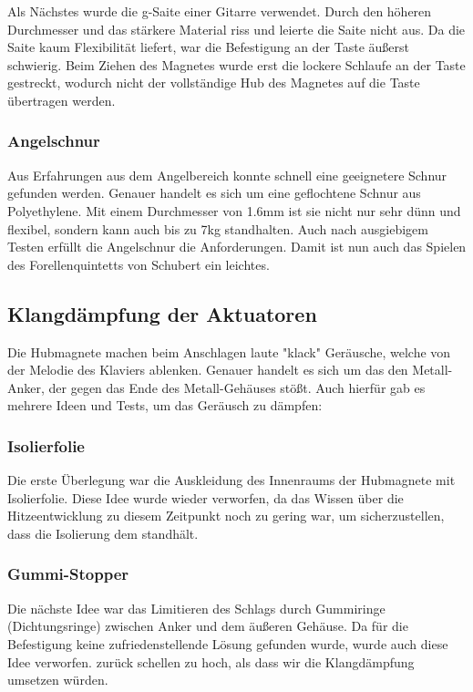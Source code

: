\begin{enumerate}
Als Nächstes wurde die g-Saite einer Gitarre verwendet.
Durch den höheren Durchmesser und das stärkere Material riss und leierte die Saite nicht aus.
Da die Saite kaum Flexibilität liefert, war die Befestigung an der Taste äußerst schwierig.
Beim Ziehen des Magnetes wurde erst die lockere Schlaufe an der Taste gestreckt, wodurch nicht der vollständige Hub des Magnetes auf die Taste übertragen werden.

\subsubsection{Angelschnur}

Aus Erfahrungen aus dem Angelbereich konnte schnell eine geeignetere Schnur gefunden werden.
Genauer handelt es sich um eine geflochtene Schnur aus Polyethylene.
Mit einem Durchmesser von 1.6mm ist sie nicht nur sehr dünn und flexibel, sondern kann auch bis zu 7kg standhalten.
Auch nach ausgiebigem Testen erfüllt die Angelschnur die Anforderungen.
Damit ist nun auch das Spielen des Forellenquintetts von Schubert ein leichtes.

\subsection{Klangdämpfung der Aktuatoren}
Die Hubmagnete machen beim Anschlagen laute "klack" Geräusche, welche von der Melodie des Klaviers ablenken.
Genauer handelt es sich um das den Metall-Anker, der gegen das Ende des Metall-Gehäuses stößt.
Auch hierfür gab es mehrere Ideen und Tests, um das Geräusch zu dämpfen:

\subsubsection{Isolierfolie}

Die erste Überlegung war die Auskleidung des Innenraums der Hubmagnete mit Isolierfolie.
Diese Idee wurde wieder verworfen, da das Wissen über die Hitzeentwicklung zu diesem Zeitpunkt noch zu gering war, um sicherzustellen, dass die Isolierung dem standhält.

\subsubsection{Gummi-Stopper}

Die nächste Idee war das Limitieren des Schlags durch Gummiringe (Dichtungsringe) zwischen Anker und dem äußeren Gehäuse.
Da für die Befestigung keine zufriedenstellende Lösung gefunden wurde, wurde auch diese Idee verworfen.
zurück schellen zu hoch, als dass wir die Klangdämpfung umsetzen würden.


\end{enumerate}
